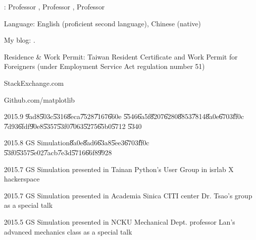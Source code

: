 \documentclass{sebase}
\begin{document}
\bigskip





\bigskip

: Professor \href{http://physics.usc.edu/~kresin/%
}{\underline{\color{blue}}}, Professor \href{http://dornsife.usc.edu/cf/phys/faculty_display.cfm?person_ID=1003141%
}{\underline{\color{blue}}}, Professor \href{https://www.physics.gatech.edu/user/walter-de-heer%
}{\underline{\color{blue}}}\bigskip


\textsf{Language: English (proficient second language), Chinese (native)}

\textsf{My blog: \href{http://whymranderson.blogspot.com}{\underline{%
\color{blue}}}.}

\textsf{Residence \& Work Permit: Taiwan Resident Certificate and Work
Permit for Foreigners (under Employment Service Act regulation number 51) }

\bigskip


StackExchange.com

Github.com/matplotlib

\bigskip


\textsf{2015.9 \U{9ad8}\U{503c}\U{5316}\U{8eca}\U{7528}\U{7167}\U{660e}%
\U{5546}\U{6a5f}\U{8207}\U{6280}\U{8853}\U{7814}\U{8a0e}\U{6703}\U{ff0c}%
\U{7d93}\U{6fdf}\U{90e8}\U{5357}\U{53f0}\U{7063}\U{5275}\U{65b0}\U{5712}%
\U{5340}}

\textsf{2015.8 GS Simulation\U{8a0e}\U{8ad6}\U{63a8}\U{5ee3}\U{6703}\U{ff0c}%
\U{53f0}\U{5357}\U{5e02}\U{7acb}\U{7e3d}\U{5716}\U{66f8}\U{9928}}

\textsf{2015.7 GS Simulation presented in Tainan Python's User Group in
isrlab X hackerspace}

\textsf{2015.7 GS Simulation presented in Academia Sinica CITI center Dr.
Tsao's group as a special talk}

\textsf{2015.5 GS Simulation presented in NCKU Mechanical Dept. professor
Lan's advanced mechanics class as a special talk}
\end{document}
